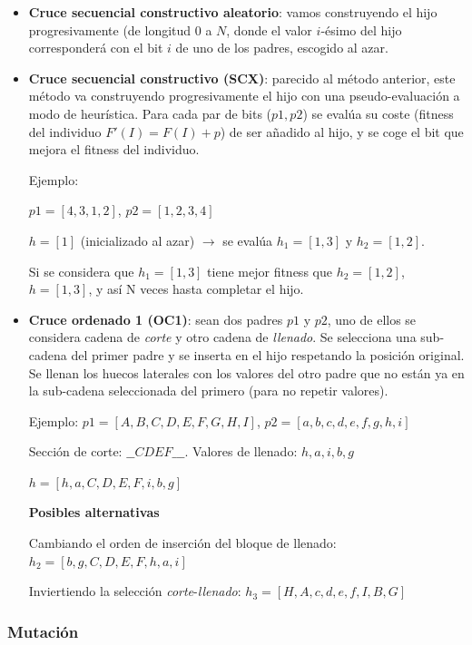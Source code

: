 \documentclass[12pt]{article}
\begin{document}
\begin{itemize}
    \item \textbf{Cruce secuencial constructivo aleatorio}: vamos construyendo el hijo progresivamente (de longitud $0$ a $N$, donde el valor $i$-ésimo del hijo corresponderá con el bit $i$ de uno de los padres, escogido al azar.
    \item \textbf{Cruce secuencial constructivo (SCX)}: parecido al método anterior, este método va construyendo progresivamente el hijo con una pseudo-evaluación a modo de heurística. Para cada par de bits ($p1, p2$) se evalúa su coste (fitness del individuo $F'(I)=F(I)+p$) de ser añadido al hijo, y se coge el bit que mejora el fitness del individuo.

    Ejemplo: 
    
    $p1=[4,3,1,2]$, $p2=[1,2,3,4]$
    
    $h =[1]$ (inicializado al azar) $\rightarrow$ se evalúa $h_1=[1,3]$ y $h_2=[1,2]$. 
    
    Si se considera que $h_1=[1,3]$ tiene mejor fitness que $h_2=[1,2]$, $h=[1,3]$, y así N veces hasta completar el hijo.

    \item \textbf{Cruce ordenado 1 (OC1)}: sean dos padres $p1$ y $p2$, uno de ellos se considera cadena de \emph{corte} y otro cadena de \emph{llenado}. Se selecciona una sub-cadena del primer padre y se inserta en el hijo respetando la posición original. Se llenan los huecos laterales con los valores del otro padre que no están ya en la sub-cadena seleccionada del primero (para no repetir valores).

    Ejemplo:
    $p1=[A,B,C,D,E,F,G,H,I]$, $p2=[a,b,c,d,e,f,g,h,i]$
    
    Sección de corte: $\_ \_ CDEF \_ \_ \_$. Valores de llenado: $h,a,i,b,g$
    
    $h=[h, a, C, D, E, F, i, b, g]$
    
    \textbf{Posibles alternativas}
    
    \subitem Cambiando el orden de inserción del bloque de llenado: $h_2=[b, g, C, D, E, F, h, a, i]$
    
    \subitem Inviertiendo la selección \emph{corte}-\emph{llenado}: $h_3=[H, A, c, d, e, f, I, B, G]$
    
\end{itemize}


\subsubsection{Mutación}
\end{document}
